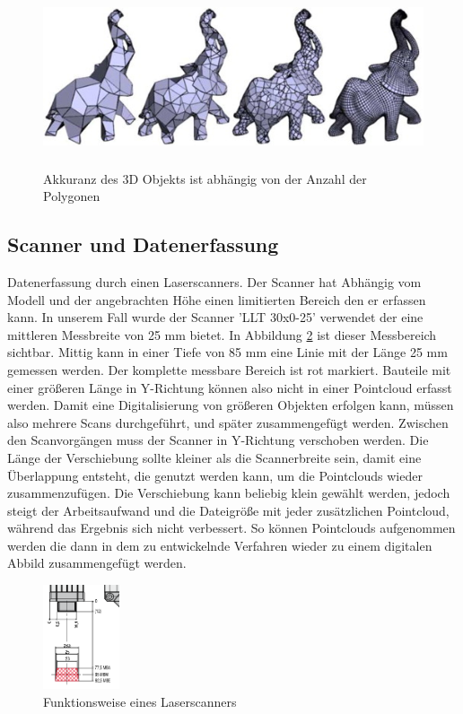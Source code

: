 \documentclass[../main.tex]{subfiles}
\begin{document}
\begin{figure}[h]
    \centering
    \includegraphics[height=150pt]{images/polgyonMeshes.jpg}
    \caption{Akkuranz des 3D Objekts ist abhängig von der Anzahl der Polygonen}
    \label{fig:meshes}
\end{figure}


\subsection{Scanner und Datenerfassung}

Datenerfassung durch einen Laserscanners.
Der Scanner hat Abhängig vom Modell und der angebrachten Höhe einen limitierten
Bereich den er erfassen kann.
In unserem Fall wurde der Scanner 'LLT 30x0-25' verwendet der 
eine mittleren Messbreite von 25 mm bietet. 
In Abbildung \ref{fig:scanner} ist dieser Messbereich sichtbar. Mittig kann 
in einer Tiefe von 85 mm eine Linie mit der Länge 25 mm gemessen werden. 
Der komplette messbare Bereich ist rot markiert. \cite{MESSTECHNIK_2020}
Bauteile mit einer größeren Länge in Y-Richtung können also nicht in einer Pointcloud
erfasst werden. Damit eine Digitalisierung von größeren Objekten erfolgen kann, müssen
also mehrere Scans durchgeführt, und später zusammengefügt werden. Zwischen den 
Scanvorgängen muss der Scanner in Y-Richtung verschoben werden.
Die Länge der Verschiebung sollte 
kleiner als die Scannerbreite sein, damit eine Überlappung entsteht, die 
genutzt werden kann, um die Pointclouds wieder zusammenzufügen. Die Verschiebung kann 
beliebig klein gewählt werden, jedoch steigt der Arbeitsaufwand und die Dateigröße mit 
jeder zusätzlichen Pointcloud, während das Ergebnis sich nicht verbessert.
So können Pointclouds aufgenommen werden die dann in dem zu entwickelnde Verfahren
wieder zu einem digitalen Abbild zusammengefügt werden.

\begin{figure}[h]
    \includegraphics[width=0.2\textwidth]{images/Scanner.PNG}
    \caption{Funktionsweise eines Laserscanners}
    \label{fig:scanner}
\end{figure}
\end{document}
